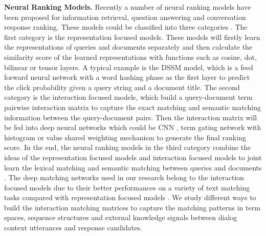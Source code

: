



\textbf{Neural Ranking Models.}
Recently a number of neural ranking models have been proposed for information retrieval, question answering and conversation response ranking. These models could be classified into three categories \cite{Guo:2016:DRM:2983323.2983769}. The first category is the representation focused models. These models will firstly learn the representations of queries and documents separately and then calculate the similarity score of the learned representations with functions such as cosine, dot, bilinear or tensor layers. A typical example is the DSSM \cite{DBLP:conf/cikm/HuangHGDAH13} model, which is a feed forward neural network with a word hashing phase as the first layer to predict the click probability given a query string and a document title. The second category is the interaction focused models, which build a query-document term pairwise interaction matrix to capture the exact matching and semantic matching information between the query-document pairs. Then the interaction matrix will be fed into deep neural networks which could be CNN \cite{DBLP:conf/nips/HuLLC14,DBLP:conf/aaai/PangLGXWC16,alime-tl}, term gating network with histogram or value shared weighting mechanism \cite{Guo:2016:DRM:2983323.2983769,Yang:2016:ARS:2983323.2983818} to generate the final ranking score. In the end, the neural ranking models in the third category combine the ideas of the representation focused models and interaction focused models to joint learn the lexical matching and semantic matching between queries and documents \cite{Mitra:2017:LMU:3038912.3052579,alime-tl}. The deep matching networks used in our research belong to the interaction focused models due to their better performances on a variety of text matching tasks compared with representation focused models \cite{DBLP:conf/nips/HuLLC14,DBLP:conf/aaai/PangLGXWC16,Guo:2016:DRM:2983323.2983769,Yang:2016:ARS:2983323.2983818,DBLP:conf/acl/WuWXZL17, Xiong:2017:ENA:3077136.3080809}. We study different ways to build the interaction matching matrices to capture the matching patterns in term spaces, sequence structures and external knowledge signals between dialog context utterances and response candidates.




